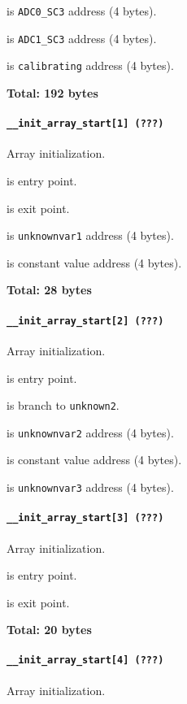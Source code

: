  is \texttt{ADC0\_SC3} address (4 bytes).

 is \texttt{ADC1\_SC3} address (4 bytes).

 is \texttt{calibrating} address (4 bytes).

\textbf{Total: 192 bytes}

\paragraph{\texttt{\_\_init\_array\_start[1] (???)}} Array initialization.

 is entry point.

 is exit point.

 is \texttt{unknownvar1} address (4 bytes).

 is constant value address (4 bytes).

\textbf{Total: 28 bytes}

\paragraph{\texttt{\_\_init\_array\_start[2] (???)}} Array initialization.

 is entry point.

 is branch to \texttt{unknown2}.

 is \texttt{unknownvar2} address (4 bytes).

 is constant value address (4 bytes).

 is \texttt{unknownvar3} address (4 bytes).

\paragraph{\texttt{\_\_init\_array\_start[3] (???)}} Array initialization.

 is entry point.

 is exit point.

\textbf{Total: 20 bytes}

\paragraph{\texttt{\_\_init\_array\_start[4] (???)}} Array initialization.

